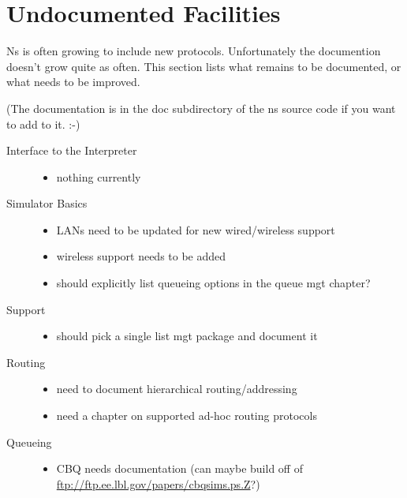
\chapter{Undocumented Facilities}

Ns is often growing to include new protocols.
Unfortunately the documention doesn't grow quite as often.
This section lists what remains to be documented,
  or what needs to be improved.

(The documentation is in the doc subdirectory of the ns source code
  if you want to add to it. :-)

\begin{description}
\item[Interface to the Interpreter]

	\begin{itemize}
	\item nothing currently
	\end{itemize}

\item[Simulator Basics]

	\begin{itemize}
	\item LANs need to be updated for new wired/wireless support
	\item wireless support needs to be added
	\item should explicitly list queueing options in the queue mgt chapter?
	\end{itemize}

\item[Support]

	\begin{itemize}
	\item should pick a single list mgt package and document it
	\end{itemize}

\item[Routing]

	\begin{itemize}
	\item need to document hierarchical routing/addressing
	\item need a chapter on supported ad-hoc routing protocols
	\end{itemize}

\item[Queueing]

	\begin{itemize}
	\item CBQ needs documentation (can maybe build off of 
		\url{ftp://ftp.ee.lbl.gov/papers/cbqsims.ps.Z}?)
	\end{itemize}


\end{description}
